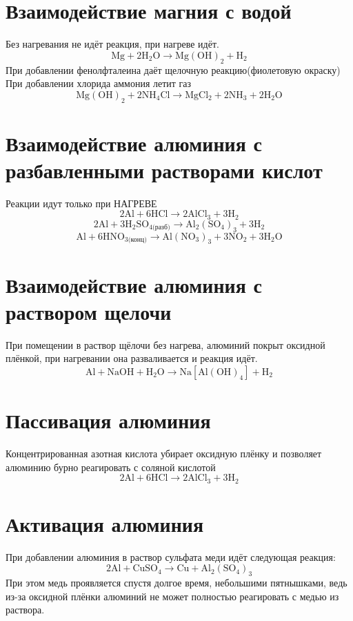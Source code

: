 \documentclass[a4paper,12pt]{article}
\begin{document}
\section{Взаимодействие магния с водой}
Без нагревания не идёт реакция, при нагреве идёт.
\begin{equation} 
\mathrm{Mg + 2H_2O \longrightarrow Mg(OH)_2 + H_2} 
\end{equation}
При добавлении фенолфталеина даёт щелочную реакцию(фиолетовую окраску)
При добавлении хлорида аммония летит газ
\begin{equation} 
\mathrm{Mg(OH)_2 + 2NH_4Cl \longrightarrow MgCl_2 + 2NH_3 + 2H_2O} 
\end{equation}
\section{Взаимодействие алюминия с разбавленными растворами кислот}
Реакции идут только при НАГРЕВЕ
\begin{equation} 
\mathrm{2Al + 6HCl \longrightarrow 2AlCl_3 + 3H_2} 
\end{equation}
\begin{equation} 
\mathrm{2Al + 3H_2SO_{4\text{(разб)}} \longrightarrow Al_2(SO_4)_3 + 3H_2} 
\end{equation}
\begin{equation} 
\mathrm{Al + 6HNO_{3\text{(конц)}} \longrightarrow Al(NO_3)_3 + 3NO_2 + 3H_2O} 
\end{equation}
\section{Взаимодействие алюминия с раствором щелочи}
При помещении в раствор щёлочи без нагрева, алюминий покрыт оксидной плёнкой, при нагревании она разваливается и реакция идёт.
\begin{equation} 
\mathrm{Al + NaOH + H_2O \longrightarrow Na[Al(OH)_4] + H_2}
\end{equation}
\section{Пассивация алюминия}
Концентрированная азотная кислота убирает оксидную плёнку и позволяет алюминию бурно реагировать с соляной кислотой
\begin{equation} 
\mathrm{2Al + 6HCl \longrightarrow 2AlCl_3 + 3H_2} 
\end{equation}
\section{Активация алюминия}
При добавлении алюминия в раствор сульфата меди идёт следующая реакция:
\begin{equation} 
\mathrm{2Al + CuSO_4 \longrightarrow Cu + Al_2(SO_4)_3} 
\end{equation}
При этом медь проявляется спустя долгое время, небольшими пятнышками, ведь из-за оксидной плёнки алюминий не может полностью реагировать с медью из раствора.
\end{document}

